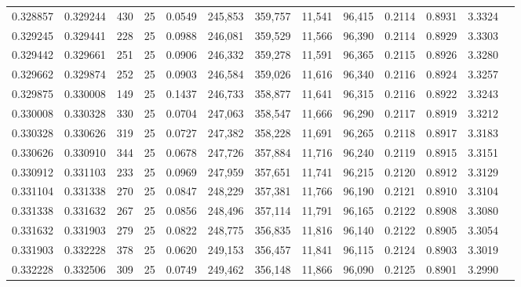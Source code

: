 \begin{tabular}{rrrrrrrrrrrrr}
0.328857 & 0.329244 &   430 &  25 &                                     0.0549 & 245,853 & 359,757 &  11,541 &  96,415 & 0.2114 & 0.8931 & 3.3324 \\
0.329245 & 0.329441 &   228 &  25 &                                     0.0988 & 246,081 & 359,529 &  11,566 &  96,390 & 0.2114 & 0.8929 & 3.3303 \\
0.329442 & 0.329661 &   251 &  25 &                                     0.0906 & 246,332 & 359,278 &  11,591 &  96,365 & 0.2115 & 0.8926 & 3.3280 \\
0.329662 & 0.329874 &   252 &  25 &                                     0.0903 & 246,584 & 359,026 &  11,616 &  96,340 & 0.2116 & 0.8924 & 3.3257 \\
0.329875 & 0.330008 &   149 &  25 &                                     0.1437 & 246,733 & 358,877 &  11,641 &  96,315 & 0.2116 & 0.8922 & 3.3243 \\
0.330008 & 0.330328 &   330 &  25 &                                     0.0704 & 247,063 & 358,547 &  11,666 &  96,290 & 0.2117 & 0.8919 & 3.3212 \\
0.330328 & 0.330626 &   319 &  25 &                                     0.0727 & 247,382 & 358,228 &  11,691 &  96,265 & 0.2118 & 0.8917 & 3.3183 \\
0.330626 & 0.330910 &   344 &  25 &                                     0.0678 & 247,726 & 357,884 &  11,716 &  96,240 & 0.2119 & 0.8915 & 3.3151 \\
0.330912 & 0.331103 &   233 &  25 &                                     0.0969 & 247,959 & 357,651 &  11,741 &  96,215 & 0.2120 & 0.8912 & 3.3129 \\
0.331104 & 0.331338 &   270 &  25 &                                     0.0847 & 248,229 & 357,381 &  11,766 &  96,190 & 0.2121 & 0.8910 & 3.3104 \\
0.331338 & 0.331632 &   267 &  25 &                                     0.0856 & 248,496 & 357,114 &  11,791 &  96,165 & 0.2122 & 0.8908 & 3.3080 \\
0.331632 & 0.331903 &   279 &  25 &                                     0.0822 & 248,775 & 356,835 &  11,816 &  96,140 & 0.2122 & 0.8905 & 3.3054 \\
0.331903 & 0.332228 &   378 &  25 &                                     0.0620 & 249,153 & 356,457 &  11,841 &  96,115 & 0.2124 & 0.8903 & 3.3019 \\
0.332228 & 0.332506 &   309 &  25 &                                     0.0749 & 249,462 & 356,148 &  11,866 &  96,090 & 0.2125 & 0.8901 & 3.2990 \\

\end{tabular}
